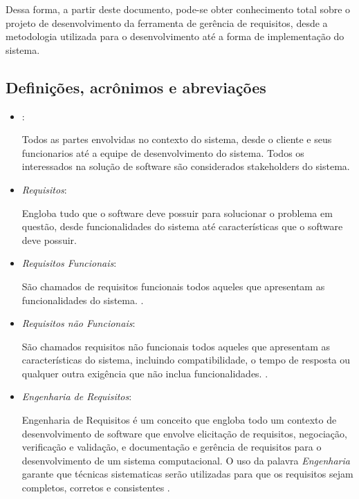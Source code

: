 Dessa forma, a partir deste documento, pode-se obter conhecimento total sobre o projeto de desenvolvimento da ferramenta de gerência de requisitos, desde a metodologia utilizada para o desenvolvimento até a forma de implementação do sistema.

\subsection{Definições, acrônimos e abreviações}

\begin{itemize}
	\item \stakeholder:

		Todos as partes envolvidas no contexto do sistema, desde o cliente e seus funcionarios até a equipe de desenvolvimento do sistema. Todos os interessados na solução de software são considerados stakeholders do sistema.

	\item \textit{Requisitos}: 

		Engloba tudo que o software deve possuir para solucionar o problema em questão, desde funcionalidades do sistema até características que o software deve possuir.

	\item \textit{Requisitos Funcionais}:

		São chamados de requisitos funcionais todos aqueles que apresentam as funcionalidades do sistema. \cite{sommerville2003engenharia}.

	\item \textit{Requisitos não Funcionais}:

		São chamados requisitos não funcionais todos aqueles que apresentam as características do sistema, incluindo compatibilidade, o tempo de resposta ou qualquer outra exigência que não inclua funcionalidades. \cite{sommerville2003engenharia}.

	\item \textit{Engenharia de Requisitos}:

		Engenharia de Requisitos é um conceito que engloba todo um contexto de desenvolvimento de software que envolve elicitação de requisitos, negociação, verificação e validação, e documentação e gerência de requisitos para o desenvolvimento de um sistema computacional. O uso da palavra \textit{Engenharia} garante que técnicas sistematicas serão utilizadas para que os requisitos sejam completos, corretos e consistentes \cite{de2004analise}. 


\end{itemize}
